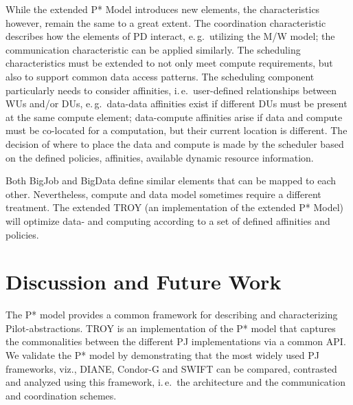 \documentclass[conference,final]{IEEEtran}
\newcommand{\upp}{\vspace*{-0.5em}}
\begin{document}
While the extended P* Model introduces new elements, the
characteristics however, remain the same to a great extent. The
coordination characteristic describes how the elements of PD interact,
e.\,g.\ utilizing the M/W model; the communication characteristic can
be applied similarly. The scheduling characteristics must be extended
to not only meet compute requirements, but also to support common data
access patterns. The scheduling component particularly needs to
consider affinities, i.\,e.\ user-defined relationships between WUs
and/or DUs, e.\,g.\ data-data affinities exist if different DUs must
be present at the same compute element; data-compute affinities arise
if data and compute must be co-located for a computation, but their
current location is different. The decision of where to place the data
and compute is made by the scheduler based on the defined policies,
affinities, available dynamic resource information.



Both BigJob and BigData define similar elements that can be mapped to
each other. Nevertheless, compute and data model sometimes require a
different treatment.  The extended TROY (an implementation of the
extended P* Model) will optimize data- and computing according to a
set of defined affinities and policies.



\section{Discussion and Future Work \upp\upp}


The P* model provides a common framework for describing and
characterizing Pilot-abstractions. TROY is an implementation of the P*
model that captures the commonalities between the different PJ
implementations via a common API.  We validate the P* model by
demonstrating that the most widely used PJ frameworks, viz., DIANE,
Condor-G and SWIFT can be compared, contrasted and analyzed using this
framework, i.\,e.\ the architecture and the communication and
coordination schemes.

\end{document}
